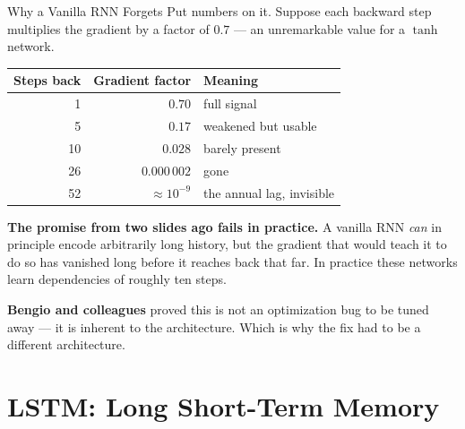 \documentclass[aspectratio=169, 11pt]{beamer}
\begin{document}
\begin{frame}{Why a Vanilla RNN Forgets \parencite{Bengio1994}}
  Put numbers on it. Suppose each backward step multiplies the gradient by a factor of $0.7$ ---
  an unremarkable value for a $\tanh$ network.

  \vspace{0.1cm}
  \begin{center}
    {\small
    \begin{tabular}{rrl}
      \toprule
      \textbf{Steps back} & \textbf{Gradient factor} & \textbf{Meaning} \\
      \midrule
      1  & $0.70$        & full signal \\
      5  & $0.17$        & weakened but usable \\
      10 & $0.028$       & barely present \\
      26 & $0.000\,002$  & gone \\
      52 & $\approx 10^{-9}$ & the annual lag, invisible \\
      \bottomrule
    \end{tabular}
    }
  \end{center}

  \vspace{0.1cm}
  \textbf{The promise from two slides ago fails in practice.} A vanilla RNN \emph{can} in
  principle encode arbitrarily long history, but the gradient that would teach it to do so has
  vanished long before it reaches back that far. In practice these networks learn dependencies of
  roughly ten steps.

  \vspace{0.1cm}
  \textbf{Bengio and colleagues} proved this is not an optimization bug to be tuned away --- it
  is inherent to the architecture. Which is why the fix had to be a different architecture.
\end{frame}

\section{LSTM: Long Short-Term Memory}

\end{document}
